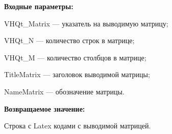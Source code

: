 \textbf{Входные параметры:}

VHQt\_Matrix --- указатель на выводимую матрицу;
 
VHQt\_N --- количество строк в матрице;
 
VHQt\_M --- количество столбцов в матрице;
 
TitleMatrix --- заголовок выводимой матрицы;
 
NameMatrix --- обозначение матрицы.
	
\textbf{Возвращаемое значение:}

Строка с Latex кодами с выводимой матрицей.